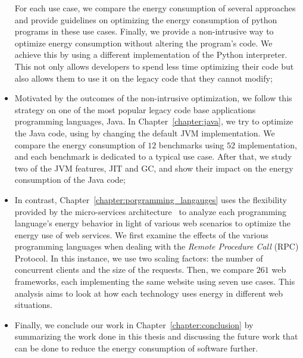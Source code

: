 \begin{itemize}
            For each use case, we compare the energy consumption of several approaches and provide guidelines on optimizing the energy consumption of python programs in these use cases.
            Finally, we provide a non-intrusive way to optimize energy consumption without altering the program's code.
            We achieve this by using a different implementation of the Python interpreter.
            This not only allows developers to spend less time optimizing their code but also allows them to use it on the legacy code that they cannot modify;
      \item Motivated by the outcomes of the non-intrusive optimization, we follow this strategy on one of the most popular legacy code base applications programming languages, Java.
            In Chapter~\ref{chapter:java}, we try to optimize the Java code, using by changing the default JVM implementation.
            We compare the energy consumption of $12$ benchmarks using $52$ implementation, and each benchmark is dedicated to a typical use case.
            After that, we study two of the JVM features, JIT and GC, and show their impact on the energy consumption of the Java code;
      \item In contrast, Chapter~\ref{chapter:porgramming_langauges}  uses the flexibility provided by the micro-services architecture~\cite{dmitry2014micro} to analyze each programming language's energy behavior in light of various web scenarios to optimize the energy use of web services.
            We first examine the effects of the various programming languages when dealing with the \emph{Remote Procedure Call} (RPC) Protocol.
            In this instance, we use two scaling factors: the number of concurrent clients and the size of the requests. Then, we compare $261$ web frameworks, each implementing the same website using seven use cases.
            This analysis aims to look at how each technology uses energy in different web situations.
      \item Finally, we conclude our work in Chapter~\ref{chapter:conclusion} by summarizing the work done in this thesis and discussing the future work that can be done to reduce the energy consumption of software further.
\end{itemize}

